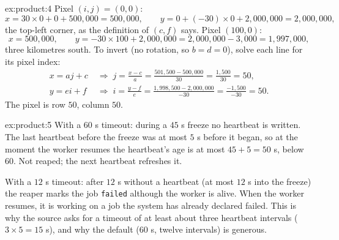 \begin{solution}{ex:product:4}
Pixel $(i, j) = (0, 0)$:
\[ x = 30 \times 0 + 0 + 500{,}000 = 500{,}000,\qquad y = 0 + (-30)\times 0 + 2{,}000{,}000 = 2{,}000{,}000, \]
the top-left corner, as the definition of $(c, f)$ says. Pixel $(100, 0)$:
\[ x = 500{,}000,\qquad y = -30 \times 100 + 2{,}000{,}000 = 2{,}000{,}000 - 3{,}000 = 1{,}997{,}000, \]
three kilometres south. To invert (no rotation, so $b = d = 0$), solve each line for its pixel index:
\begin{align*}
x = a j + c \;&\Rightarrow\; j = \frac{x - c}{a} = \frac{501{,}500 - 500{,}000}{30} = \frac{1{,}500}{30} = 50,\\
y = e i + f \;&\Rightarrow\; i = \frac{y - f}{e} = \frac{1{,}998{,}500 - 2{,}000{,}000}{-30} = \frac{-1{,}500}{-30} = 50.
\end{align*}
The pixel is row $50$, column $50$.
\end{solution}

\begin{solution}{ex:product:5}
With a $60$ s timeout: during a $45$ s freeze no heartbeat is written. The last heartbeat before the
freeze was at most $5$ s before it began, so at the moment the worker resumes the heartbeat's age is
at most $45 + 5 = 50$ s, below $60$. Not reaped; the next heartbeat refreshes it.

With a $12$ s timeout: after $12$ s without a heartbeat (at most $12$ s into the freeze) the reaper
marks the job \texttt{failed} although the worker is alive. When the worker resumes, it is working on
a job the system has already declared failed. This is why the source asks for a timeout of at least
about three heartbeat intervals ($3 \times 5 = 15$ s), and why the default ($60$ s, twelve intervals)
is generous.
\end{solution}
